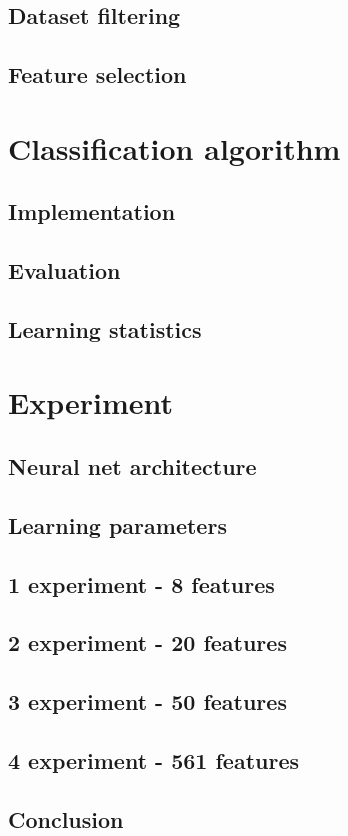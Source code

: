 \documentclass[12pt,a4paper]{article}
\begin{document}
\subsection{Dataset filtering}
\subsection{Feature selection}

\section{Classification algorithm}
\subsection{Implementation}
\subsection{Evaluation}
\subsection{Learning statistics}

\section{Experiment}
\subsection{Neural net architecture}
\subsection{Learning parameters}
\subsection{1 experiment - 8 features}
\subsection{2 experiment - 20 features}
\subsection{3 experiment - 50 features}
\subsection{4 experiment - 561 features}
\subsection{Conclusion}


\end{document}
